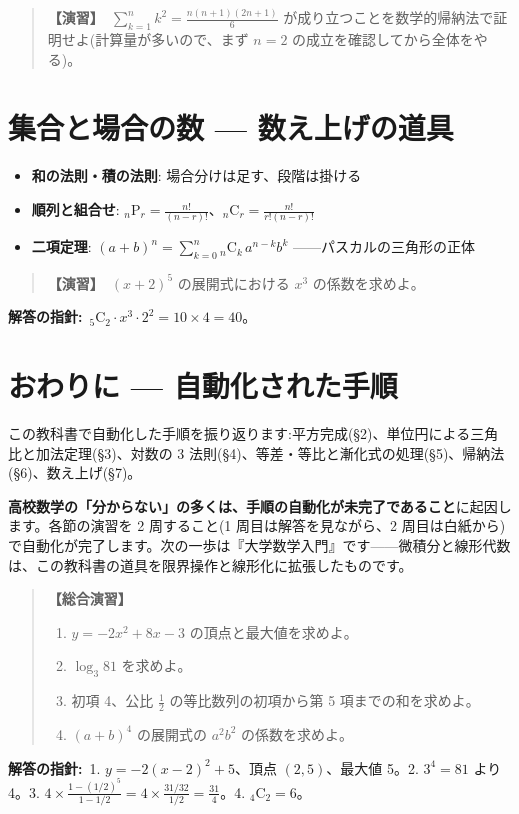 \documentclass{article}
\begin{document}
\begin{quote}
\textbf{【演習】}\ \(\displaystyle \sum_{k=1}^{n} k^2 = \frac{n(n+1)(2n+1)}{6}\) が成り立つことを数学的帰納法で証明せよ(計算量が多いので、まず \(n = 2\) の成立を確認してから全体をやる)。
\end{quote}

\section{集合と場合の数 — 数え上げの道具}

\begin{itemize}
\item \textbf{和の法則・積の法則}: 場合分けは足す、段階は掛ける
\item \textbf{順列と組合せ}: \({}_n\mathrm{P}_r = \frac{n!}{(n-r)!}\)、\({}_n\mathrm{C}_r = \frac{n!}{r!(n-r)!}\)
\item \textbf{二項定理}: \((a+b)^n = \sum_{k=0}^{n} {}_n\mathrm{C}_k\, a^{n-k} b^k\) ——パスカルの三角形の正体
\end{itemize}

\begin{quote}
\textbf{【演習】}\ \((x + 2)^5\) の展開式における \(x^3\) の係数を求めよ。
\end{quote}

\textbf{解答の指針:}\ \({}_5\mathrm{C}_2 \cdot x^3 \cdot 2^2 = 10 \times 4 = 40\)。

\section{おわりに — 自動化された手順}

この教科書で自動化した手順を振り返ります:平方完成(§2)、単位円による三角比と加法定理(§3)、対数の 3 法則(§4)、等差・等比と漸化式の処理(§5)、帰納法(§6)、数え上げ(§7)。

\textbf{高校数学の「分からない」の多くは、手順の自動化が未完了であること}に起因します。各節の演習を 2 周すること(1 周目は解答を見ながら、2 周目は白紙から)で自動化が完了します。次の一歩は『大学数学入門』です——微積分と線形代数は、この教科書の道具を限界操作と線形化に拡張したものです。

\begin{quote}
\textbf{【総合演習】}
\begin{enumerate}
\item \(y = -2x^2 + 8x - 3\) の頂点と最大値を求めよ。
\item \(\log_3 81\) を求めよ。
\item 初項 4、公比 \(\frac{1}{2}\) の等比数列の初項から第 5 項までの和を求めよ。
\item \((a + b)^4\) の展開式の \(a^2b^2\) の係数を求めよ。
\end{enumerate}
\end{quote}

\textbf{解答の指針:}\ 1. \(y = -2(x-2)^2 + 5\)、頂点 \((2, 5)\)、最大値 5。2. \(3^4 = 81\) より 4。3. \(4 \times \frac{1 - (1/2)^5}{1 - 1/2} = 4 \times \frac{31/32}{1/2} = \frac{31}{4}\)。4. \({}_4\mathrm{C}_2 = 6\)。
\end{document}

